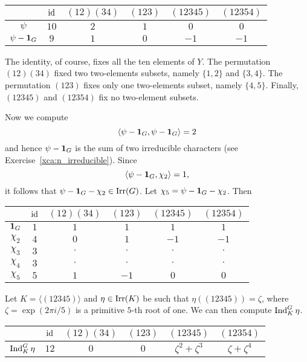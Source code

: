 \bigskip 
\begin{center}
        \begin{tabular}{|c|ccccc|}
        \hline  
         & $\operatorname{id}$ & $(12)(34)$ & $(123)$ & $(12345)$ & $(12354)$\\
        \hline 
        $\psi$ & $10$ & $2$ & $1$ & $0$ & $0$\\
        $\psi-\mathbf{1}_G$ & $9$ & $1$ & $0$ & $-1$ & $-1$\\
        \hline 
    \end{tabular}
\end{center}
\bigskip 

The identity, of course, fixes all the ten elements
of $Y$. The permutation 
$(12)(34)$ fixed two two-elements subsets, namely
$\{1,2\}$ and $\{3,4\}$. The permutation 
$(123)$ fixes only one two-elements subset, namely
$\{4,5\}$. Finally, $(12345)$ and 
$(12354)$ fix no two-element subsets. 

Now we compute 
\[
\langle \psi-\mathbf{1}_G,\psi-\mathbf{1}_G\rangle=2
\]
and hence $\psi-\mathbf{1}_G$ is the sum of two irreducible
characters (see Exercise~\ref{xca:n_irreducible}). Since
\[
\langle \psi-\mathbf{1}_G,\chi_2\rangle=1,
\]
it follows that $\psi-\mathbf{1}_G-\chi_2\in\operatorname{Irr}(G)$. Let 
$\chi_5=\psi-\mathbf{1}_G-\chi_2$. Then

\bigskip 
\begin{center}
        \begin{tabular}{|c|ccccc|}
        \hline  
         & $\operatorname{id}$ & $(12)(34)$ & $(123)$ & $(12345)$ & $(12354)$\\
        \hline 
        $\mathbf{1}_G$ & $1$ & $1$ & $1$ & $1$ & $1$\\
        $\chi_2$ & $4$ & $0$ & $1$ & $-1$ & $-1$\\
        $\chi_3$ & $3$ & $\cdot$ & $\cdot$ & $\cdot$& $\cdot$\\
        $\chi_4$ & $3$ & $\cdot$ & $\cdot$ & $\cdot$& $\cdot$\\
        $\chi_5$ & $5$ & $1$ & $-1$ & $0$& $0$\\
        \hline 
    \end{tabular}
\end{center}
\bigskip 

Let $K=\langle(12345)\rangle$ and 
$\eta\in\operatorname{Irr}(K)$ be such that $\eta((12345))=\zeta$, where
$\zeta=\exp(2\pi i/5)$ is a primitive $5$-th root of one. We can then compute 
$\operatorname{Ind}_K^G\eta$. 

\bigskip 
\begin{center}
        \begin{tabular}{|c|ccccc|}
        \hline  
         & $\operatorname{id}$ & $(12)(34)$ & $(123)$ & $(12345)$ & $(12354)$\\
         \hline 
         $\operatorname{Ind}_K^G\eta$ & $12$ & $0$ & $0$ & $\zeta^2+\zeta^3$ & $\zeta+\zeta^4$\\
         \hline 
\end{tabular}
\end{center}
\bigskip 

